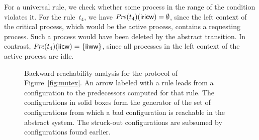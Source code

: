 For a universal rule, we check whether some process in the range of the
condition violates it. For the rule~$t_4$, we have
$\mathit{Pre}(t_4)(\mathsf{i}\mathsf{r}\mathsf{i}\mathsf{c}\mathsf{w}) = \emptyset$, since the left context of
the critical process, which would be the active process, contains a
requesting process. Such a process would have been deleted by the abstract
transition. In contrast, $\mathit{Pre}(t_4)(\mathsf{i}\mathsf{i}\mathsf{c}\mathsf{w}) =
\{\mathsf{i}\mathsf{i}\mathsf{w}\mathsf{w}\}$, since all processes in the left context of the
active process are idle.

\begin{figure}[t]
\centering
{}
\caption{Backward reachability analysis for the protocol of
Figure~\ref{fig:mutex}. An arrow labeled with a rule leads from a
configuration to the predecessors computed for that rule. The configurations
in solid boxes form the generator of the set of configurations from which a
bad configuration is reachable in the abstract system. The struck-out
configurations are subsumed by configurations found earlier.}
\label{fig:mutex-backward}
\end{figure}

